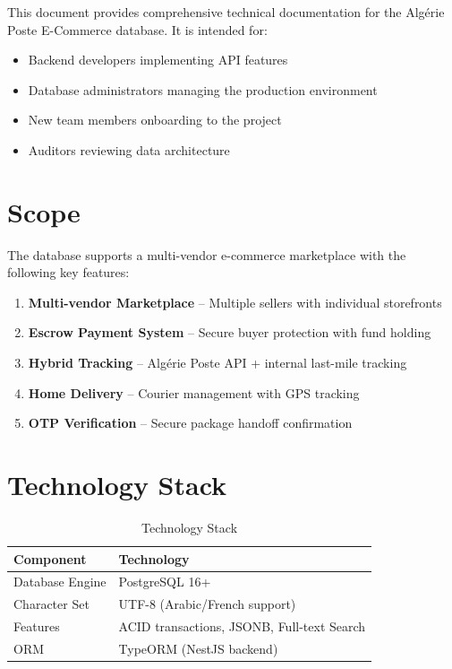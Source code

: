 \documentclass[12pt,a4paper]{report}
\begin{document}
This document provides comprehensive technical documentation for the Algérie Poste E-Commerce database. It is intended for:

\begin{itemize}
    \item Backend developers implementing API features
    \item Database administrators managing the production environment
    \item New team members onboarding to the project
    \item Auditors reviewing data architecture
\end{itemize}

\section{Scope}

The database supports a multi-vendor e-commerce marketplace with the following key features:

\begin{enumerate}
    \item \textbf{Multi-vendor Marketplace} -- Multiple sellers with individual storefronts
    \item \textbf{Escrow Payment System} -- Secure buyer protection with fund holding
    \item \textbf{Hybrid Tracking} -- Algérie Poste API + internal last-mile tracking
    \item \textbf{Home Delivery} -- Courier management with GPS tracking
    \item \textbf{OTP Verification} -- Secure package handoff confirmation
\end{enumerate}

\section{Technology Stack}

\begin{table}[h]
\centering
\begin{tabular}{ll}
\toprule
\textbf{Component} & \textbf{Technology} \\
\midrule
Database Engine & PostgreSQL 16+ \\
Character Set & UTF-8 (Arabic/French support) \\
Features & ACID transactions, JSONB, Full-text Search \\
ORM & TypeORM (NestJS backend) \\
\bottomrule
\end{tabular}
\caption{Technology Stack}
\end{table}
\end{document}
